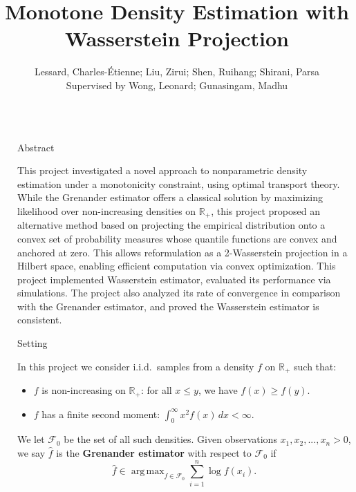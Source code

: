 \documentclass[final]{beamer}
\title{Monotone Density Estimation with Wasserstein Projection}
\author{Lessard, Charles-Étienne; Liu, Zirui; Shen, Ruihang; Shirani, Parsa\\Supervised by Wong, Leonard; Gunasingam, Madhu}
\institute[shortinst]{Department of Statistical Sciences, University of Toronto}
\DeclareMathOperator*{\argmax}{arg\,max}
\newlength{\sepwidth}
\newlength{\colwidth}
\newcommand{\separatorcolumn}{\begin{column}{\sepwidth}\end{column}}
\begin{document}
\begin{frame}[t]
\begin{columns}[t]
\separatorcolumn

\begin{column}{\colwidth}

  \begin{block}{Abstract}

    This project investigated a novel approach to nonparametric density estimation under a monotonicity constraint, using optimal transport theory. While the Grenander estimator offers a classical solution by maximizing likelihood over non-increasing densities on $\mathbb{R}_+$, this project proposed an alternative method based on projecting the empirical distribution onto a convex set of probability measures whose quantile functions are convex and anchored at zero. This allows reformulation as a 2-Wasserstein projection in a Hilbert space, enabling efficient computation via convex optimization. This project implemented Wasserstein estimator, evaluated its performance via simulations. The project also analyzed its rate of convergence in comparison with the Grenander estimator, and proved the Wasserstein estimator is consistent.

     

  
  \end{block}

  


  \begin{block}{Setting}

  In this project we consider i.i.d.~samples from a density $f$ on $\mathbb{R}_+$ such that: 
    \begin{itemize}
    \item $f$ is non-increasing on $\mathbb{R}_+$: for all $x \leq y$, we have $f(x) \geq f(y)$.%
    \item $f$ has a finite second moment: $\int_0^\infty x^2 f(x)\, dx < \infty$.
  \end{itemize}
  We let $\mathcal{F}_0$ be the set of all such densities. Given observations $x_1,x_2,...,x_n > 0$, we say $\hat{f}$ is the \textbf{Grenander estimator} with respect to $\mathcal{F}_0$ if \begin{equation*} %
\hat{f} \in \argmax_{f \in \mathcal{F}_0} \sum_{i = 1}^n \log f(x_i).
\end{equation*}


\end{block}
\end{column}
\end{columns}
\end{frame}
\end{document}
